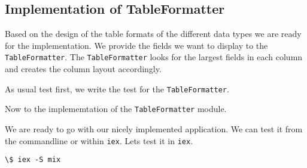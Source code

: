\documentclass[10pt, a4paper]{article}
\newcommand{\includecode}[3]{}
\begin{document}
\subsection{Implementation of TableFormatter}
Based on the design of the table formats of the different data types we are
ready for the implementation. We provide the fields we want to display to
the \texttt{TableFormatter}. The \texttt{TableFormatter} looks for the 
largest fields in each column and creates the column layout accordingly.

As usual test first, we write the test for the \texttt{TableFormatter}.

\includecode{test/table\_formatter\_test.exs}{lst:tableformattertest}
            {listings/table-formatter-test.exs}

Now to the implememtation of the \texttt{TableFormatter} module.

\includecode{lib/noaa/table\_formatter.ex}{lst:tableformatter}
            {listings/table-formatter.ex}


We are ready to go with our nicely implemented application. We can test it 
from the commandline or within \texttt{iex}. Lets test it in \texttt{iex}.

\begin{verbatim}
\$ iex -S mix

\end{verbatim}


    
\end{document}
